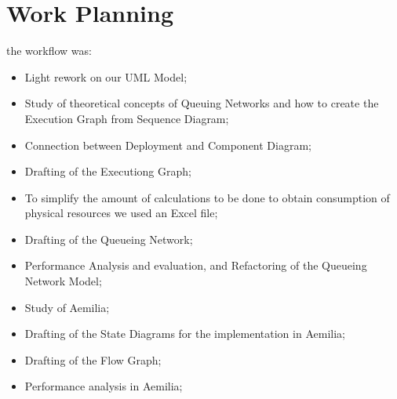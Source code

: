 \newpage \chapter{\textbf{Work Planning}}

the workflow was:

\begin{itemize}
	\item Light rework on our UML Model;
	\item Study of theoretical concepts of Queuing Networks and how to 			create the Execution Graph from Sequence Diagram;
	\item Connection between Deployment and Component Diagram;
	\item Drafting of the Executiong Graph;
	\item To simplify the amount of calculations to be done to obtain    	consumption of physical resources we used an Excel file;
	\item Drafting of the Queueing Network;
	\item Performance Analysis and evaluation, and Refactoring of the 			Queueing Network Model;
	\item Study of Aemilia;
	\item Drafting of the State Diagrams for the implementation in 				Aemilia;
	\item Drafting of the Flow Graph;
	\item Performance analysis in Aemilia;	
\end{itemize}

